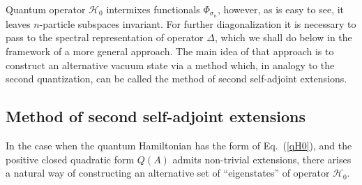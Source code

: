 \documentclass[12pt]{article}
\newcommand{\HH}{\mathscr{H}}
\begin{document}
	Quantum operator
$ \HH_{0} $
	intermixes functionals
$ \Phi_{\sigma_{n}} $,
	however, as is easy to see, 
	it leaves
$ n $-particle subspaces invariant.
	For further diagonalization it is necessary to pass
	to the spectral representation of operator
$ \Delta $,
	which we shall do below in the framework of a more general approach.
	The main idea of that approach is
	to construct an alternative vacuum state via a method
	which, in analogy to the second quantization, can be called
	the method of second self-adjoint extensions.



\subsection{Method of second self-adjoint extensions}
	In the case when the quantum Hamiltonian has the form of 
Eq.~(\ref{qH0}),
	and the positive closed quadratic form
$ Q(A) $
	admits non-trivial extensions,
	there arises a natural way of constructing an alternative
    set of ``eigenstates'' of operator
$ \HH_{0} $.
\end{document}
